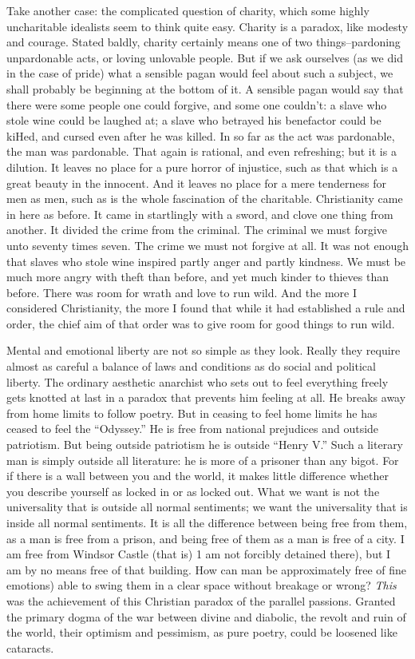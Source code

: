 \documentclass{book}
\begin{document}
Take another case: the complicated question of charity, which some highly uncharitable idealists seem to think quite easy. Charity is a paradox, like modesty and courage. Stated baldly, charity certainly means one of two things–pardoning unpardonable acts, or loving unlovable people. But if we ask ourselves (as we did in the case of pride) what a sensible pagan would feel about such a subject, we shall probably be beginning at the bottom of it. A sensible pagan would say that there were some people one could forgive, and some one couldn’t: a slave who stole wine could be laughed at; a slave who betrayed his benefactor could be kiHed, and cursed even after he was killed. In so far as the act was pardonable, the man was pardonable. That again is rational, and even refreshing; but it is a dilution. It leaves no place for a pure horror of injustice, such as that which is a great beauty in the innocent. And it leaves no place for a mere tenderness for men as men, such as is the whole fascination of the charitable. Christianity came in here as before. It came in startlingly with a sword, and clove one thing from another. It divided the crime from the criminal. The criminal we must forgive unto seventy times seven. The crime we must not forgive at all. It was not enough that slaves who stole wine inspired partly anger and partly kindness. We must be much more angry with theft than before, and yet much kinder to thieves than before. There was room for wrath and love to run wild. And the more I considered Christianity, the more I found that while it had established a rule and order, the chief aim of that order was to give room for good things to run wild.

Mental and emotional liberty are not so simple as they look. Really they require almost as careful a balance of laws and conditions as do social and political liberty. The ordinary aesthetic anarchist who sets out to feel everything freely gets knotted at last in a paradox that prevents him feeling at all. He breaks away from home limits to follow poetry. But in ceasing to feel home limits he has ceased to feel the “Odyssey.” He is free from national prejudices and outside patriotism. But being outside patriotism he is outside “Henry V.” Such a literary man is simply outside all literature: he is more of a prisoner than any bigot. For if there is a wall between you and the world, it makes little difference whether you describe yourself as locked in or as locked out. What we want is not the universality that is outside all normal sentiments; we want the universality that is inside all normal sentiments. It is all the difference between being free from them, as a man is free from a prison, and being free of them as a man is free of a city. I am free from Windsor Castle (that is) 1 am not forcibly detained there), but I am by no means free of that building. How can man be approximately free of fine emotions) able to swing them in a clear space without breakage or wrong? \emph{This} was the achievement of this Christian paradox of the parallel passions. Granted the primary dogma of the war between divine and diabolic, the revolt and ruin of the world, their optimism and pessimism, as pure poetry, could be loosened like cataracts.
\end{document}
